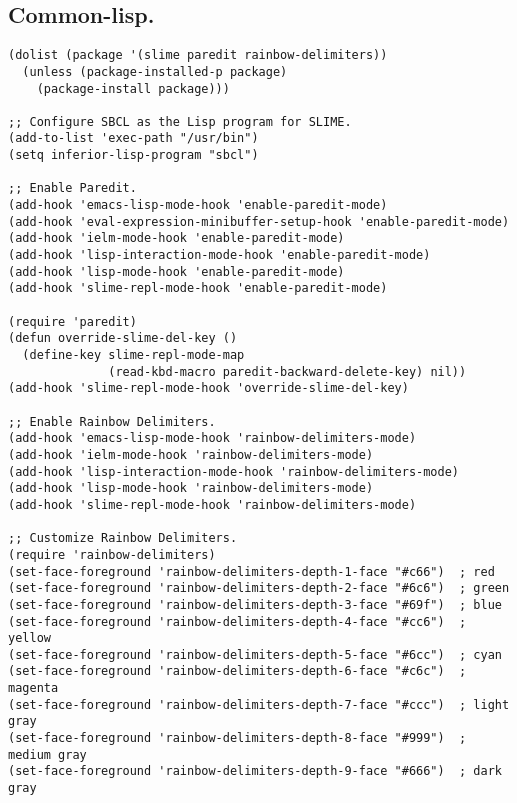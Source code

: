 \documentclass[11pt]{article}
\begin{document}
\subsection{Common-lisp.}
\label{sec:orge1c76ac}
\begin{verbatim}
(dolist (package '(slime paredit rainbow-delimiters))
  (unless (package-installed-p package)
    (package-install package)))

;; Configure SBCL as the Lisp program for SLIME.
(add-to-list 'exec-path "/usr/bin")
(setq inferior-lisp-program "sbcl")

;; Enable Paredit.
(add-hook 'emacs-lisp-mode-hook 'enable-paredit-mode)
(add-hook 'eval-expression-minibuffer-setup-hook 'enable-paredit-mode)
(add-hook 'ielm-mode-hook 'enable-paredit-mode)
(add-hook 'lisp-interaction-mode-hook 'enable-paredit-mode)
(add-hook 'lisp-mode-hook 'enable-paredit-mode)
(add-hook 'slime-repl-mode-hook 'enable-paredit-mode)

(require 'paredit)
(defun override-slime-del-key ()
  (define-key slime-repl-mode-map
              (read-kbd-macro paredit-backward-delete-key) nil))
(add-hook 'slime-repl-mode-hook 'override-slime-del-key)

;; Enable Rainbow Delimiters.
(add-hook 'emacs-lisp-mode-hook 'rainbow-delimiters-mode)
(add-hook 'ielm-mode-hook 'rainbow-delimiters-mode)
(add-hook 'lisp-interaction-mode-hook 'rainbow-delimiters-mode)
(add-hook 'lisp-mode-hook 'rainbow-delimiters-mode)
(add-hook 'slime-repl-mode-hook 'rainbow-delimiters-mode)

;; Customize Rainbow Delimiters.
(require 'rainbow-delimiters)
(set-face-foreground 'rainbow-delimiters-depth-1-face "#c66")  ; red
(set-face-foreground 'rainbow-delimiters-depth-2-face "#6c6")  ; green
(set-face-foreground 'rainbow-delimiters-depth-3-face "#69f")  ; blue
(set-face-foreground 'rainbow-delimiters-depth-4-face "#cc6")  ; yellow
(set-face-foreground 'rainbow-delimiters-depth-5-face "#6cc")  ; cyan
(set-face-foreground 'rainbow-delimiters-depth-6-face "#c6c")  ; magenta
(set-face-foreground 'rainbow-delimiters-depth-7-face "#ccc")  ; light gray
(set-face-foreground 'rainbow-delimiters-depth-8-face "#999")  ; medium gray
(set-face-foreground 'rainbow-delimiters-depth-9-face "#666")  ; dark gray
\end{verbatim}
\end{document}
